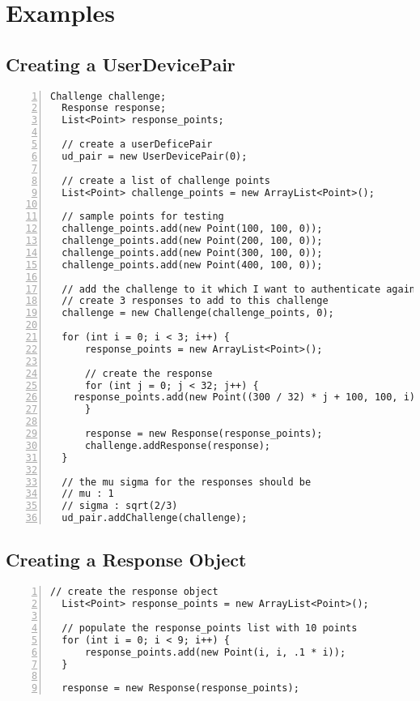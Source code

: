 \documentclass{article} %
\begin{document}
\section{Examples}
\subsection{Creating a UserDevicePair}

\begin{lstlisting}[numbers=left]
  Challenge challenge;
  Response response;
  List<Point> response_points;

  // create a userDeficePair
  ud_pair = new UserDevicePair(0);

  // create a list of challenge points
  List<Point> challenge_points = new ArrayList<Point>();

  // sample points for testing
  challenge_points.add(new Point(100, 100, 0));
  challenge_points.add(new Point(200, 100, 0));
  challenge_points.add(new Point(300, 100, 0));
  challenge_points.add(new Point(400, 100, 0));

  // add the challenge to it which I want to authenticate against
  // create 3 responses to add to this challenge
  challenge = new Challenge(challenge_points, 0);

  for (int i = 0; i < 3; i++) {
      response_points = new ArrayList<Point>();

      // create the response
      for (int j = 0; j < 32; j++) {
    response_points.add(new Point((300 / 32) * j + 100, 100, i));
      }

      response = new Response(response_points);
      challenge.addResponse(response);
  }

  // the mu sigma for the responses should be
  // mu : 1
  // sigma : sqrt(2/3)
  ud_pair.addChallenge(challenge);
\end{lstlisting}

\subsection{Creating a Response Object}
\begin{lstlisting}[numbers=left]
  // create the response object
  List<Point> response_points = new ArrayList<Point>();

  // populate the response_points list with 10 points
  for (int i = 0; i < 9; i++) {
      response_points.add(new Point(i, i, .1 * i));
  }

  response = new Response(response_points);
\end{lstlisting}
\end{document}
